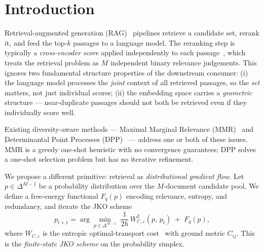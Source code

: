 \documentclass{article}
\theoremstyle{plain}
\newcommand{\Wdist}{W_{\!C,\varepsilon}}
\begin{document}
\section{Introduction}
\label{sec:intro}

Retrieval-augmented generation (RAG)~\cite{lewis2020rag} pipelines retrieve a candidate set, rerank it, and feed the top-$k$ passages to a language model. The reranking step is typically a \emph{cross-encoder score} applied independently to each passage~\cite{nogueira2019mono}, which treats the retrieval problem as $M$ independent binary relevance judgements. This ignores two fundamental structure properties of the downstream consumer: (i) the language model processes the \emph{joint} context of all retrieved passages, so the \emph{set} matters, not just individual scores; (ii) the embedding space carries a \emph{geometric} structure --- near-duplicate passages should not both be retrieved even if they individually score well.

Existing diversity-aware methods --- Maximal Marginal Relevance (MMR)~\cite{carbonell1998mmr} and Determinantal Point Processes (DPP)~\cite{chen2018dpp} --- address one or both of these issues. MMR is a greedy one-shot heuristic with no convergence guarantees; DPP solves a one-shot selection problem but has no iterative refinement.

We propose a different primitive: retrieval as \emph{distributional gradient flow}. Let $p\in\Delta^{M-1}$ be a probability distribution over the $M$-document candidate pool. We define a free-energy functional $F_q(p)$ encoding relevance, entropy, and redundancy, and iterate the JKO scheme
\begin{equation}
  p_{t+1} = \arg\min_{p\in\Delta^{M-1}}\; \frac{1}{2h}\,\Wdist^2(p,\,p_t)\;+\;F_q(p),
  \label{eq:jko}
\end{equation}
where $\Wdist$ is the entropic optimal-transport cost~\cite{cuturi2013sinkhorn} with ground metric $C_{ij}$. This is the \emph{finite-state JKO scheme} on the probability simplex.
\end{document}
